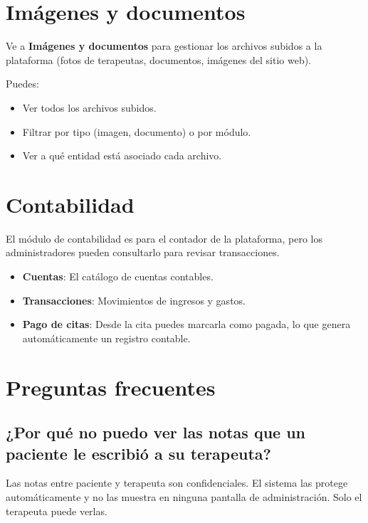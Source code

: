 \documentclass[12pt,a4paper]{article}
\begin{document}
\section{Imágenes y documentos}

Ve a \textbf{Imágenes y documentos} para gestionar los archivos subidos a la plataforma
(fotos de terapeutas, documentos, imágenes del sitio web).

Puedes:
\begin{itemize}
  \item Ver todos los archivos subidos.
  \item Filtrar por tipo (imagen, documento) o por módulo.
  \item Ver a qué entidad está asociado cada archivo.
\end{itemize}

\section{Contabilidad}

El módulo de contabilidad es para el contador de la plataforma, pero los
administradores pueden consultarlo para revisar transacciones.

\begin{itemize}
  \item \textbf{Cuentas}: El catálogo de cuentas contables.
  \item \textbf{Transacciones}: Movimientos de ingresos y gastos.
  \item \textbf{Pago de citas}: Desde la cita puedes marcarla como pagada,
        lo que genera automáticamente un registro contable.
\end{itemize}

\section{Preguntas frecuentes}

\subsection{¿Por qué no puedo ver las notas que un paciente le escribió a su terapeuta?}
Las notas entre paciente y terapeuta son confidenciales. El sistema las protege
automáticamente y no las muestra en ninguna pantalla de administración.
Solo el terapeuta puede verlas.
\end{document}
